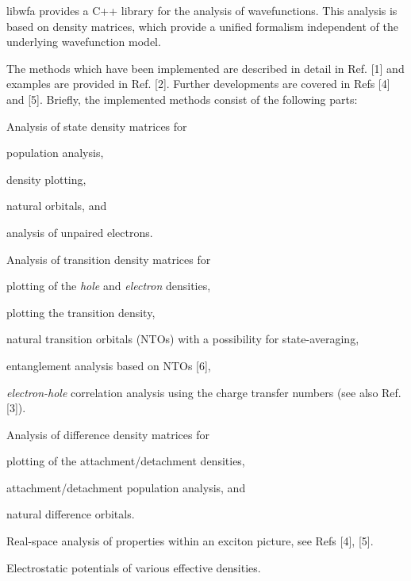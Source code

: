 {\ttfamily libwfa} provides a C++ library for the analysis of wavefunctions. This analysis is based on density matrices, which provide a unified formalism independent of the underlying wavefunction model.

The methods which have been implemented are described in detail in Ref. \mbox{[}1\mbox{]} and examples are provided in Ref. \mbox{[}2\mbox{]}. Further developments are covered in Refs \mbox{[}4\mbox{]} and \mbox{[}5\mbox{]}. Briefly, the implemented methods consist of the following parts\+:


\begin{DoxyEnumerate}
\item Analysis of state density matrices for
\begin{DoxyItemize}
\item population analysis,
\item density plotting,
\item natural orbitals, and
\item analysis of unpaired electrons.
\end{DoxyItemize}
\item Analysis of transition density matrices for
\begin{DoxyItemize}
\item plotting of the {\itshape hole} and {\itshape electron} densities,
\item plotting the transition density,
\item natural transition orbitals (NTOs) with a possibility for state-\/averaging,
\item entanglement analysis based on NTOs \mbox{[}6\mbox{]},
\item {\itshape electron-\/hole} correlation analysis using the charge transfer numbers (see also Ref. \mbox{[}3\mbox{]}).
\end{DoxyItemize}
\item Analysis of difference density matrices for
\begin{DoxyItemize}
\item plotting of the attachment/detachment densities,
\item attachment/detachment population analysis, and
\item natural difference orbitals.
\end{DoxyItemize}
\item Real-\/space analysis of properties within an exciton picture, see Refs \mbox{[}4\mbox{]}, \mbox{[}5\mbox{]}.
\item Electrostatic potentials of various effective densities.
\end{DoxyEnumerate}

